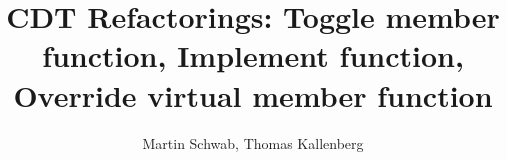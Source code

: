 \documentclass[a4paper,10pt]{scrreprt}
\title{CDT Refactorings: Toggle member function, Implement function, Override virtual member function}
\author{Martin Schwab, Thomas Kallenberg}
\begin{document}
\maketitle

\begin{abstract}
\end{abstract}
\end{document}
